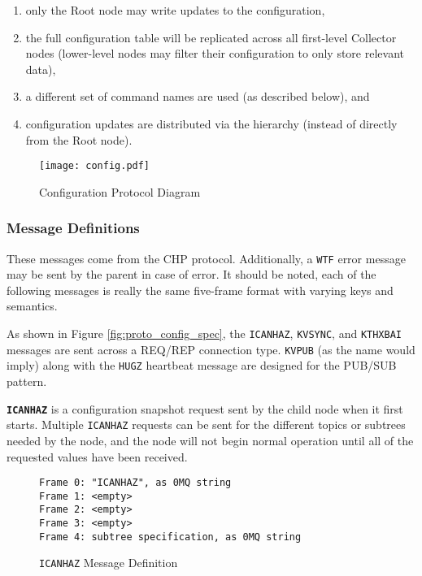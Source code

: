 \begin{enumerate}
\item only the Root node may write updates to the configuration,
\item the full configuration table will be replicated across all first-level Collector nodes (lower-level nodes may
      filter their configuration to only store relevant data),
\item a different set of command names are used (as described below), and
\item configuration updates are distributed via the \dcamp hierarchy (instead of directly from the Root node).
\end{enumerate}

\begin{figure}[H]
    \centering
    \texttt{[image: config.pdf]}
    \caption{Configuration Protocol Diagram}
    \label{fig:proto_config_image}
\end{figure}

\subsubsection{Message Definitions}

These messages come from the CHP protocol. Additionally, a \texttt{WTF} error message may be sent by the parent in case
of error. It should be noted, each of the following messages is really the same five-frame format with varying keys and
semantics.

As shown in Figure \ref{fig:proto_config_spec}, the \texttt{ICANHAZ}, \texttt{KVSYNC}, and \texttt{KTHXBAI} messages are
sent across a REQ/REP connection type. \texttt{KVPUB} (as the name would imply) along with the \texttt{HUGZ} heartbeat
message are designed for the PUB/SUB pattern.

\textbf{\texttt{ICANHAZ}} is a configuration snapshot request sent by the child node when it first starts. Multiple
\texttt{ICANHAZ} requests can be sent for the different topics or subtrees needed by the node, and the node will not
begin normal operation until all of the requested values have been received.

\begin{figure}[H]
\vspace{+10pt}
\begin{verbatim}
Frame 0: "ICANHAZ", as 0MQ string
Frame 1: <empty>
Frame 2: <empty>
Frame 3: <empty>
Frame 4: subtree specification, as 0MQ string
\end{verbatim}
\vspace{-20pt}
\caption{\texttt{ICANHAZ} Message Definition}
\label{fig:message_icanhaz}
\end{figure}

